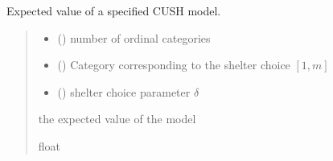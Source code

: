 \documentclass[letterpaper,10pt,english]{sphinxmanual}
\begin{document}

\begin{fulllineitems}
\label{\detokenize{cubmods:cubmods.cush.mean}}
\pysigstartsignatures
{}
\pysigstopsignatures
\sphinxAtStartPar
Expected value of a specified CUSH model.
\begin{quote}\begin{description}
\begin{itemize}
\item {} 
\sphinxAtStartPar
{} () \textendash{} number of ordinal categories

\item {} 
\sphinxAtStartPar
{} () \textendash{} Category corresponding to the shelter choice \([1,m]\)

\item {} 
\sphinxAtStartPar
{} () \textendash{} shelter choice parameter \(\delta\)

\end{itemize}

\sphinxAtStartPar
the expected value of the model

\sphinxAtStartPar
float

\end{description}\end{quote}

\end{fulllineitems}

\end{document}
